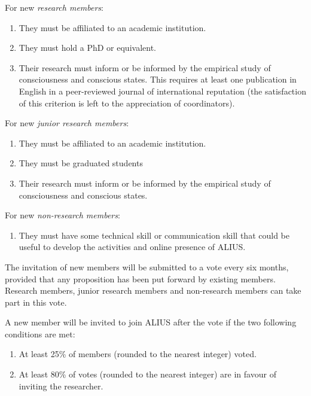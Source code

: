 \documentclass[a4paper, 11pt]{scrartcl}
\begin{document}
For new \emph{research members}:

\begin{enumerate}
\item They must be affiliated to an academic institution. 
\item They must hold a PhD or equivalent.
\item Their research must inform or be informed by the empirical study of consciousness and conscious states. This requires at least one publication in English in a peer-reviewed journal of international reputation (the satisfaction of this criterion is left to the appreciation of coordinators).

\end{enumerate}

For new \emph{junior research members}:

\begin{enumerate}
\item They must be affiliated to an academic institution.
\item They must be graduated students 
\item Their research must inform or be informed by the empirical study of consciousness and conscious states.

\end{enumerate}

For new \emph{non-research members}:   

\begin{enumerate}

\item They must have some technical skill or communication skill that could be useful to develop the activities and online presence of ALIUS.

\end{enumerate}

\noindent The invitation of new members will be submitted to a vote every six months, provided that any proposition has been put forward by existing members. Research members, junior research members and non-research members can take part in this vote.

A new member will be invited to join ALIUS after the vote if the two following conditions are met:

\begin{enumerate}
\item At least 25\% of members (rounded to the nearest integer) voted.
\item At least 80\% of votes (rounded to the nearest integer) are in favour of inviting the researcher.
\end{enumerate}
\end{document}
